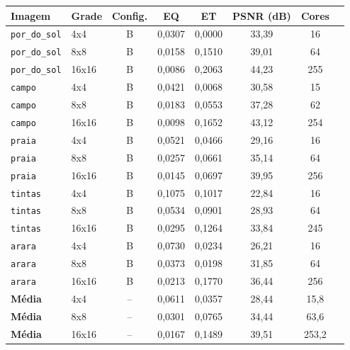 \begin{tabular}{llcccccc}
\toprule
Imagem & Grade & Config. & EQ & ET & PSNR (dB) & Cores \\
\midrule
\texttt{por\_do\_sol} & 4x4 & B & 0{,}0307 & 0{,}0000 & 33{,}39 & 16 \\
\texttt{por\_do\_sol} & 8x8 & B & 0{,}0158 & 0{,}1510 & 39{,}01 & 64 \\
\texttt{por\_do\_sol} & 16x16 & B & 0{,}0086 & 0{,}2063 & 44{,}23 & 255 \\
\midrule
\texttt{campo} & 4x4 & B & 0{,}0421 & 0{,}0068 & 30{,}58 & 15 \\
\texttt{campo} & 8x8 & B & 0{,}0183 & 0{,}0553 & 37{,}28 & 62 \\
\texttt{campo} & 16x16 & B & 0{,}0098 & 0{,}1652 & 43{,}12 & 254 \\
\midrule
\texttt{praia} & 4x4 & B & 0{,}0521 & 0{,}0466 & 29{,}16 & 16 \\
\texttt{praia} & 8x8 & B & 0{,}0257 & 0{,}0661 & 35{,}14 & 64 \\
\texttt{praia} & 16x16 & B & 0{,}0145 & 0{,}0697 & 39{,}95 & 256 \\
\midrule
\texttt{tintas} & 4x4 & B & 0{,}1075 & 0{,}1017 & 22{,}84 & 16 \\
\texttt{tintas} & 8x8 & B & 0{,}0534 & 0{,}0901 & 28{,}93 & 64 \\
\texttt{tintas} & 16x16 & B & 0{,}0295 & 0{,}1264 & 33{,}84 & 245 \\
\midrule
\texttt{arara} & 4x4 & B & 0{,}0730 & 0{,}0234 & 26{,}21 & 16 \\
\texttt{arara} & 8x8 & B & 0{,}0373 & 0{,}0198 & 31{,}85 & 64 \\
\texttt{arara} & 16x16 & B & 0{,}0213 & 0{,}1770 & 36{,}44 & 256 \\
\midrule
\textbf{Média} & 4x4 & -- & 0{,}0611 & 0{,}0357 & 28{,}44 & 15{,}8 \\
\textbf{Média} & 8x8 & -- & 0{,}0301 & 0{,}0765 & 34{,}44 & 63{,}6 \\
\textbf{Média} & 16x16 & -- & 0{,}0167 & 0{,}1489 & 39{,}51 & 253{,}2 \\
\bottomrule
\end{tabular}
